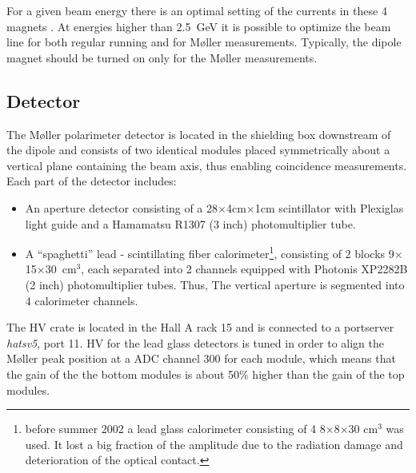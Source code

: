 {For a given beam energy there is an optimal setting of the currents in 
these 4 magnets%
.
At energies higher than 2.5~GeV it is possible
to optimize the beam line for both regular running and for 
M{\o}ller measurements. Typically, the dipole magnet should be turned on
only for the M{\o}ller measurements. 

\subsection {Detector}
\label{sec:moller_compon_det}

The M{\o}ller polarimeter detector is located in the shielding box downstream 
of the dipole and consists of two identical modules placed symmetrically about a vertical
plane containing the beam axis, thus enabling   
coincidence measurements.
Each part of the detector includes:
\begin{itemize}
  \item An aperture detector consisting of a 28$\times$4cm$\times$1cm 
        scintillator  with Plexiglas light guide and a Hamamatsu R1307 (3 inch)
        photomultiplier tube.
  \item A ``spaghetti'' lead - scintillating fiber calorimeter\footnote{
         before summer 2002 a lead glass calorimeter consisting of 4 
         8$\times$8$\times$30 cm$^3$
         was used. It lost a big fraction of the amplitude due
         to the radiation damage and deterioration of the optical contact.},
        consisting of 2 blocks 9$\times$15$\times$30~cm$^3$, each separated into 2
        channels equipped with Photonis XP2282B (2 inch) photomultiplier tubes. Thus,
        The vertical aperture is segmented into 4 calorimeter channels.
\end{itemize}
The HV crate is located in the Hall A rack 15 and is connected
to a portserver {\em hatsv5}, port 11.
HV for the lead glass detectors is tuned in order to align the M{\o}ller peak
position at a ADC channel 300 for each module, which means that the gain
of the the bottom modules is about 50\% higher than the gain of the top
modules.

}
